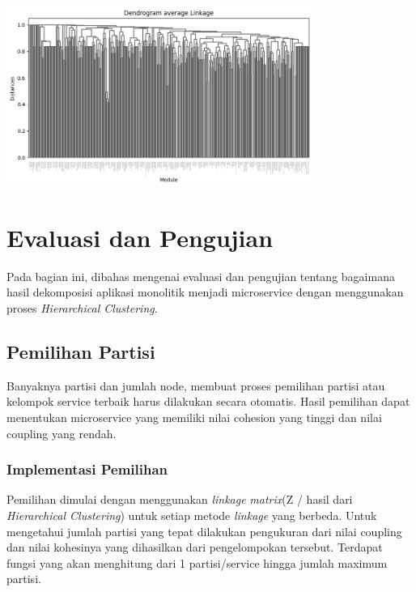 \begin{center}
	\includegraphics[width=10cm]{img/bab_4/avg_dd.png}
	\label{fig:dd_avg}
\end{center}

\pagebreak


\section{Evaluasi dan Pengujian}
Pada bagian ini, dibahas mengenai evaluasi dan pengujian tentang bagaimana hasil dekomposisi aplikasi monolitik menjadi microservice dengan menggunakan proses \textit{Hierarchical Clustering}.

\subsection{Pemilihan Partisi}
Banyaknya partisi dan jumlah node, membuat proses pemilihan partisi atau kelompok service terbaik harus dilakukan secara otomatis. Hasil pemilihan dapat menentukan microservice yang memiliki nilai cohesion yang tinggi dan nilai coupling yang rendah.

\subsubsection{Implementasi Pemilihan}
  Pemilihan dimulai dengan menggunakan \textit{linkage} \textit{matrix}(Z / hasil dari \textit{Hierarchical Clustering}) untuk setiap metode \textit{linkage} yang berbeda. Untuk mengetahui jumlah partisi yang tepat dilakukan pengukuran dari nilai coupling dan nilai kohesinya yang dihasilkan dari pengelompokan tersebut. Terdapat fungsi yang akan menghitung dari 1 partisi/service hingga jumlah maximum partisi.


